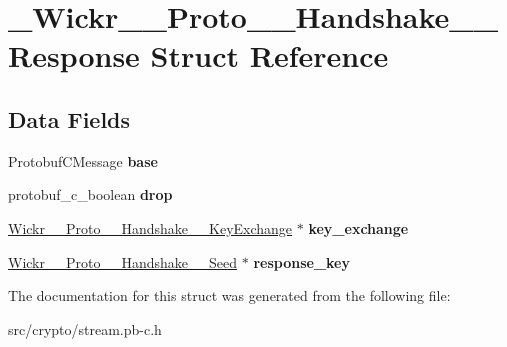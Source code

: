 \hypertarget{struct___wickr_____proto_____handshake_____response}{}\section{\+\_\+\+Wickr\+\_\+\+\_\+\+Proto\+\_\+\+\_\+\+Handshake\+\_\+\+\_\+\+Response Struct Reference}
\label{struct___wickr_____proto_____handshake_____response}
\subsection*{Data Fields}
\begin{DoxyCompactItemize}
\item 
\mbox{\label{struct___wickr_____proto_____handshake_____response_a9434c95dc5ec7d1a57825a1c4fe952c9}} 
Protobuf\+C\+Message {\bfseries base}
\item 
\mbox{\label{struct___wickr_____proto_____handshake_____response_afa7c1683d219c9b3c4a4cdc2b23c42c5}} 
protobuf\+\_\+c\+\_\+boolean {\bfseries drop}
\item 
\mbox{\label{struct___wickr_____proto_____handshake_____response_ac731157cf6f6ba128a9b686977c37cae}} 
\hyperlink{struct___wickr_____proto_____handshake_____key_exchange}{Wickr\+\_\+\+\_\+\+Proto\+\_\+\+\_\+\+Handshake\+\_\+\+\_\+\+Key\+Exchange} $\ast$ {\bfseries key\+\_\+exchange}
\item 
\mbox{\label{struct___wickr_____proto_____handshake_____response_a8fcaab0d059232f0d19c323e95a8f79c}} 
\hyperlink{struct___wickr_____proto_____handshake_____seed}{Wickr\+\_\+\+\_\+\+Proto\+\_\+\+\_\+\+Handshake\+\_\+\+\_\+\+Seed} $\ast$ {\bfseries response\+\_\+key}
\end{DoxyCompactItemize}


The documentation for this struct was generated from the following file\+:\begin{DoxyCompactItemize}
\item 
src/crypto/stream.\+pb-\/c.\+h\end{DoxyCompactItemize}
